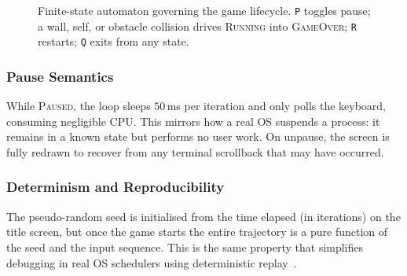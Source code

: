 \documentclass[conference]{IEEEtran}
\begin{document}
\begin{figure}[H]
    \centering
    \caption{Finite-state automaton governing the game lifecycle. \texttt{P} toggles pause; a wall, self, or obstacle collision drives \textsc{Running} into \textsc{GameOver}; \texttt{R} restarts; \texttt{Q} exits from any state.}
    \label{fig:fsm}
\end{figure}

\subsubsection{Pause Semantics}
While \textsc{Paused}, the loop sleeps $50$\,ms per iteration and only polls the keyboard, consuming negligible CPU. This mirrors how a real OS suspends a process: it remains in a known state but performs no user work. On unpause, the screen is fully redrawn to recover from any terminal scrollback that may have occurred.

\subsubsection{Determinism and Reproducibility}
The pseudo-random seed is initialised from the time elapsed (in iterations) on the title screen, but once the game starts the entire trajectory is a pure function of the seed and the input sequence. This is the same property that simplifies debugging in real OS schedulers using deterministic replay~\cite{tanenbaum2014}.
\end{document}
